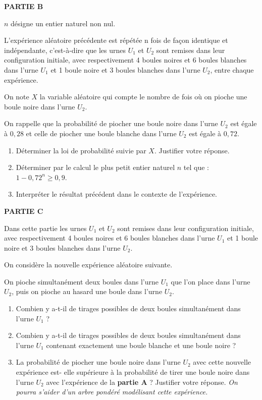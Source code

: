 \smallskip

\textbf{PARTIE B}

\medskip

$n$ désigne un entier naturel non nul.

L’expérience aléatoire précédente est répétée n fois de façon identique et indépendante, c’est-à-dire que les urnes $U_1$ et $U_2$ sont remises dans leur configuration initiale, avec respectivement 4 boules noires et 6 boules blanches dans l’urne $U_1$ et 1 boule noire et 3 boules blanches dans l’urne $U_2$, entre chaque expérience.

\smallskip

On note $X$ la variable aléatoire qui compte le nombre de fois où on pioche une boule noire dans l’urne $U_2$.

\smallskip

On rappelle que la probabilité de piocher une boule noire dans l’urne $U_2$ est égale à $0,28$ et celle de piocher une boule blanche dans l’urne $U_2$ est égale à $0,72$.

\begin{enumerate}
	\item Déterminer la loi de probabilité suivie par $X$. Justifier votre réponse.
	\item Déterminer par le calcul le plus petit entier naturel $n$ tel que :
	$1-0,72^n \geqslant 0,9$.
	\item Interpréter le résultat précédent dans le contexte de l’expérience.
\end{enumerate}

\smallskip

\textbf{PARTIE C}

\medskip

Dans cette partie les urnes $U_1$ et $U_2$ sont remises dans leur configuration initiale, avec respectivement 4 boules noires et 6 boules blanches dans l’urne $U_1$ et 1 boule noire et 3 boules
blanches dans l’urne $U_2$.

\smallskip

On considère la nouvelle expérience aléatoire suivante.

On pioche simultanément deux boules dans l’urne $U_1$ que l’on place dans l’urne $U_2$, puis on pioche au hasard une boule dans l’urne $U_2$.

\begin{enumerate}
	\item Combien y a-t-il de tirages possibles de deux boules simultanément dans l’urne $U_1$ ?
	\item Combien y a-t-il de tirages possibles de deux boules simultanément dans l’urne $U_1$ contenant exactement une boule blanche et une boule noire ?
	\item La probabilité de piocher une boule noire dans l’urne $U_2$ avec cette nouvelle expérience est- elle supérieure à la probabilité de tirer une boule noire dans l’urne $U_2$ avec l’expérience de la \textbf{partie A} ? Justifier votre réponse. \textit{On pourra s’aider d’un arbre pondéré modélisant cette expérience.}
\end{enumerate}